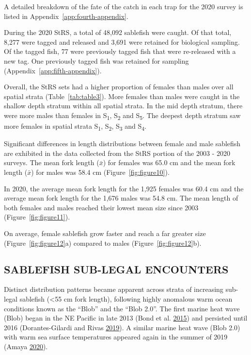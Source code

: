 \documentclass[12pt]{article}\usepackage[]{graphicx}\usepackage[]{color}
\begin{document}
A detailed breakdown of the fate of the catch in each trap for the 2020 survey is listed in Appendix~\ref{app:fourth-appendix}.

During the 2020 StRS, a total of 48,092 sablefish were caught. Of that total, 8,277 were tagged and released and 3,691 were retained for biological sampling. Of the tagged fish, 77 were previously tagged fish that were re-released with a new tag. One previously tagged fish was retained for sampling (Appendix~\ref{app:fifth-appendix}).

Overall, the StRS sets had a higher proportion of females than males over all spatial strata (Table~\ref{tab:table3}). More females than males were caught in the shallow depth stratum within all spatial strata. In the mid depth stratum, there were more males than females in S\textsubscript{1}, S\textsubscript{2} and S\textsubscript{5}. The deepest depth stratum saw more females in spatial strata S\textsubscript{1}, S\textsubscript{2}, S\textsubscript{3} and S\textsubscript{4}.

Significant differences in length distributions between female and male sablefish are exhibited in the data collected from the StRS portion of the 2003 - 2020 surveys. The mean fork length (\(\bar{x}\)) for females was 65.0 cm and the mean fork length (\(\bar{x}\)) for males was 58.4 cm (Figure~\ref{fig:figure10}).

In 2020, the average mean fork length for the 1,925 females was 60.4 cm and the average mean fork length for the 1,676 males was 54.8 cm. The mean length of both females and males reached their lowest mean size since 2003 (Figure~\ref{fig:figure11}).

On average, female sablefish grow faster and reach a far greater size (Figure~\ref{fig:figure12}a) compared to males (Figure~\ref{fig:figure12}b).

\hypertarget{sablefish-sub-legal-encounters}{%
\subsection{SABLEFISH SUB-LEGAL ENCOUNTERS}\label{sablefish-sub-legal-encounters}}

Distinct distribution patterns became apparent across strata of increasing sub-legal sablefish (\textless55 cm fork length), following highly anomalous warm ocean conditions known as the ``Blob'' and the ``Blob 2.0''. The first marine heat wave (Blob) began in the NE Pacific in late 2013 (Bond et al. \protect\hyperlink{ref-Bond2015}{2015}) and persisted until 2016 (Dorantes-Gilardi and Rivas \protect\hyperlink{ref-DORANTESGILARD2020}{2019}). A similar marine heat wave (Blob 2.0) with warm sea surface temperatures appeared again in the summer of 2019 (Amaya \protect\hyperlink{ref-Amaya2020}{2020}).
\end{document}
